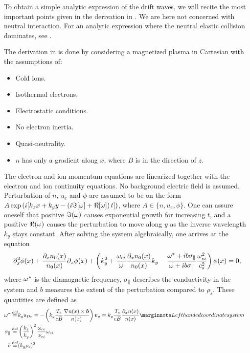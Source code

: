 To obtain a simple analytic expression of the drift waves, we will recite the most important points given in the derivation in \cite{Pecseli2016book}.
We are here not concerned with neutral interaction.
For an analytic expression where the neutral elastic collision dominates, see \cite{Ellis1980}.

The derivation in \cite{Pecseli2016book} is done by considering a magnetized plasma in Cartesian with the assumptions of:
%
\begin{itemize}[noitemsep]
    \item Cold ions.
    \item Isothermal electrons.
    \item Electrostatic conditions.
    \item No electron inertia.
    \item Quasi-neutrality.
    \item $n$ has only a gradient along $x$, where $B$ is in the direction of $z$.
\end{itemize}
%
The electron and ion momentum equations are linearized together with the electron and ion continuity equations.
No background electric field is assumed.
Perturbation of $n$, $u_e$ and $\phi$ are assumed to be on the form $A\exp\left(i[k_x x + k_y y - \left(i\Im[\omega] + \Re[\omega]\right) t]\right)$, where $A \in \{n, u_e, \phi\}$.
One can assure oneself that positive $\Im(\omega)$ causes exponential growth for increasing $t$, and a positive $\Re(\omega)$ causes the perturbation to move along $y$ as the inverse wavelength $k_y$ stays constant.
After solving the system algebraically, one arrives at the equation
%
\begin{align}
    \partial_x^2 \phi(x) +
    \frac{\partial_x n_0(x)}{n_0(x)}\partial_x \phi(x)+
    \left(k_y^2 +
    \frac{\omega_{ci}}{\omega}\frac{\partial_x n_0(x)}{n_0(x)}k_y -
    \frac{\omega^*+ib\sigma_\|}{\omega+ib\sigma_\|}\frac{\omega_{ci}^2}{c_s^2}
    \right)\phi(x)
    =0,
    \label{eq:fullDisp}
\end{align}
%
where $\omega^*$ is the diamagnetic frequency, $\sigma_\|$ describes the conductivity in the system and $b$ measures the extent of the perturbation compared to $\rho_s$.
These quantities are defined as
%
\begin{align*}
    \om^* \defined& k_y u_{De} =
    -\L(k_y \frac{T_e}{eB}\frac{\grad n(x)\times \ve{b}}{n(x)}\R)\ve{e}_y
    =
    k_y \frac{T_e}{eB}\frac{\partial_x n(x)}{n(x)}
    \note{Left handed coordinate system}
    \\
    \sigma_\| \defined& \L(\frac{k_z}{k_y}\R)^2 \frac{\om_{ce}}{\nu_{ei}}\om_{ci}\\
    b \defined& (k_y \rho_s)^2&
\end{align*}
